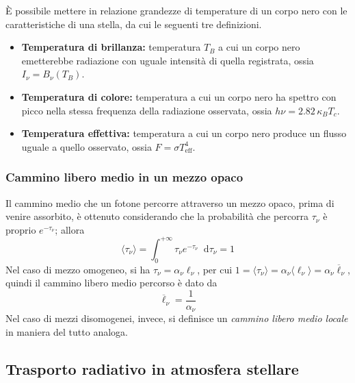 \documentclass[11pt, a4paper]{scrartcl}
\theoremstyle{style}
\theoremstyle{style1}
\newcommand{\dd}{\mathop{}\!\mathrm{d}}
\numberwithin{equation}{subsection}
\begin{document}
\`E possibile mettere in relazione grandezze di temperature di un corpo nero con le caratteristiche di una stella, da cui le seguenti tre definizioni.
\begin{itemize}
	\item \textbf{Temperatura di brillanza:} temperatura $T_B$ a cui un corpo nero emetterebbe radiazione con uguale intensit\`a di quella registrata, ossia $I_\nu = B_\nu (T_B)$.
	\item \textbf{Temperatura di colore:} temperatura a cui un corpo nero ha spettro con picco nella stessa frequenza della radiazione osservata, ossia $h\nu = 2.82 \, \kappa _B T_c$.
	\item \textbf{Temperatura effettiva:} temperatura a cui un corpo nero produce un flusso uguale a quello osservato, ossia $F = \sigma T_\text{eff}^4$.
\end{itemize}
\subsubsection{Cammino libero medio in un mezzo opaco}
Il cammino medio che un fotone percorre attraverso un mezzo opaco, prima di venire assorbito, \`e ottenuto considerando che la probabilit\`a che percorra $\tau _\nu $ \`e proprio $e^{-\tau _\nu }$; allora
\[
\langle \tau _\nu  \rangle = \int _0^{+\infty} \tau _\nu  e^{- \tau _\nu }\dd \tau _\nu  = 1
\] 
Nel caso di mezzo omogeneo, si ha $\tau _\nu  = \alpha _\nu  \ell _\nu $, per cui $1=\langle \tau _\nu  \rangle = \alpha _\nu  \langle \ell _\nu  \rangle=\alpha _\nu \overline{\ell }_\nu $, quindi il cammino libero medio percorso \`e dato da 
\[
\overline{\ell }_\nu  = \frac{1}{\alpha _\nu }
\] 
Nel caso di mezzi disomogenei, invece, si definisce un \textit{cammino libero medio locale} in maniera del tutto analoga.
\subsection{Trasporto radiativo in atmosfera stellare}
\end{document}
